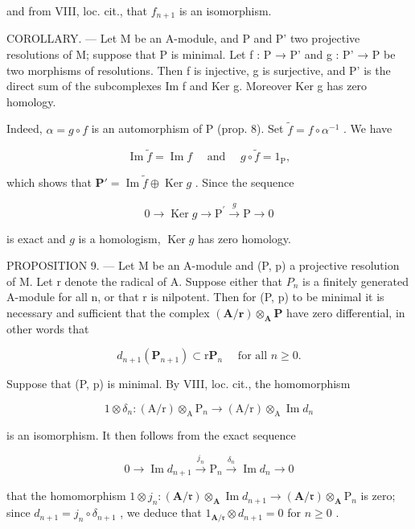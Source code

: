 and from VIII, loc. cit., that \(f_{n+1}\) is an isomorphism.

COROLLARY. --- Let M be an A-module, and P and P' two projective resolutions of M; suppose that P is minimal. Let f : P → P' and g : P' → P be two morphisms of resolutions. Then f is injective, g is surjective, and P' is the direct sum of the subcomplexes Im f and Ker g. Moreover Ker g has zero homology.

Indeed, \(\alpha = g \circ f\) is an automorphism of P (prop. 8). Set \(\tilde{f} = f \circ \alpha^{-1}\) . We have

\[
\operatorname{Im} \tilde {f} = \operatorname{Im} f \quad \text { and } \quad g \circ \tilde {f} = 1 _ {\mathrm{P}},
\]

which shows that \(\mathbf{P}' = \operatorname{Im} \tilde{f} \oplus \operatorname{Ker} g\) . Since the sequence

\[
0 \rightarrow \operatorname{Ker} g \rightarrow \mathrm{P} ^ {\prime} \stackrel {g} {\rightarrow} \mathrm{P} \rightarrow 0
\]

is exact and \(g\) is a homologism, \(\operatorname{Ker} g\) has zero homology.

PROPOSITION 9. --- Let M be an A-module and (P, p) a projective resolution of M. Let r denote the radical of A. Suppose either that \(P_{n}\) is a finitely generated A-module for all n, or that r is nilpotent. Then for (P, p) to be minimal it is necessary and sufficient that the complex \((\mathbf{A}/\mathbf{r}) \otimes_{\mathbf{A}} \mathbf{P}\) have zero differential, in other words that

\[
d _ {n + 1} (\mathbf {P} _ {n + 1}) \subset \mathrm{r} \mathbf {P} _ {n} \quad \text { for all } n \geqslant 0.
\]

Suppose that (P, p) is minimal. By VIII, loc. cit., the homomorphism

\[
1 \otimes \delta_ {n}: (\mathrm{A} / \mathrm{r}) \otimes_ {\mathrm{A}} \mathrm{P} _ {n} \rightarrow (\mathrm{A} / \mathrm{r}) \otimes_ {\mathrm{A}} \operatorname{Im} d _ {n}
\]

is an isomorphism. It then follows from the exact sequence

\[
0 \longrightarrow \operatorname{Im} d _ {n + 1} \xrightarrow {j _ {n}} \mathrm{P} _ {n} \xrightarrow {\delta_ {n}} \operatorname{Im} d _ {n} \longrightarrow 0
\]

that the homomorphism \(1 \otimes j_n : (\mathbf{A} / \mathfrak{r}) \otimes_{\mathbf{A}} \operatorname{Im} d_{n+1} \to (\mathbf{A} / \mathfrak{r}) \otimes_{\mathbf{A}} \mathrm{P}_n\) is zero; since \(d_{n+1} = j_n \circ \delta_{n+1}\) , we deduce that \(1_{\mathbf{A} / \mathfrak{r}} \otimes d_{n+1} = 0\) for \(n \geqslant 0\) .

